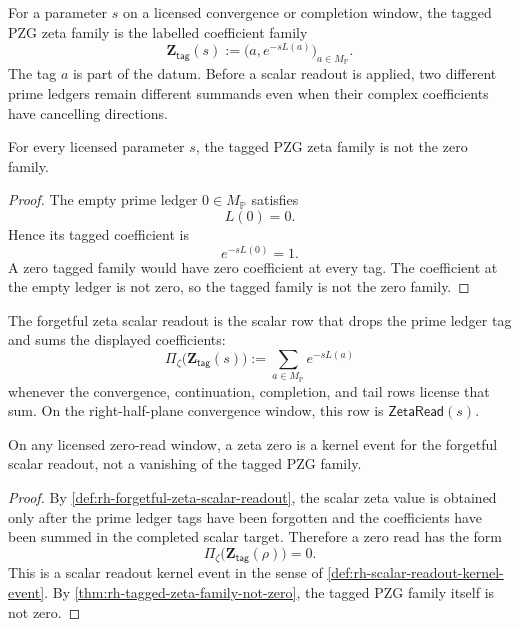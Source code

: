 \begin{definition}
\label{def:rh-tagged-pzg-zeta-family}
For a parameter $s$ on a licensed convergence or completion window, the
tagged PZG zeta family is the labelled coefficient family
$$
\mathbf Z_{\mathsf{tag}}(s)
:=
\bigl(a,e^{-sL(a)}\bigr)_{a\in M_{\mathbb P}}.
$$
The tag $a$ is part of the datum.  Before a scalar readout is applied,
two different prime ledgers remain different summands even when their
complex coefficients have cancelling directions.
\end{definition}

\begin{theorem}
\label{thm:rh-tagged-zeta-family-not-zero}
For every licensed parameter $s$, the tagged PZG zeta family is not the
zero family.
\end{theorem}

\begin{proof}
The empty prime ledger $0\in M_{\mathbb P}$ satisfies
$$
L(0)=0.
$$
Hence its tagged coefficient is
$$
e^{-sL(0)}=1.
$$
A zero tagged family would have zero coefficient at every tag.  The
coefficient at the empty ledger is not zero, so the tagged family is not
the zero family.
\end{proof}

\begin{definition}
\label{def:rh-forgetful-zeta-scalar-readout}
The forgetful zeta scalar readout is the scalar row that drops the prime
ledger tag and sums the displayed coefficients:
$$
\Pi_{\zeta}\bigl(\mathbf Z_{\mathsf{tag}}(s)\bigr)
:=
\sum_{a\in M_{\mathbb P}}e^{-sL(a)}
$$
whenever the convergence, continuation, completion, and tail rows license
that sum.  On the right-half-plane convergence window, this row is
$\mathsf{ZetaRead}(s)$.
\end{definition}

\begin{theorem}
\label{thm:rh-zeta-zeros-forgetful-kernel-events}
On any licensed zero-read window, a zeta zero is a kernel event for the
forgetful scalar readout, not a vanishing of the tagged PZG family.
\end{theorem}

\begin{proof}
By \autoref{def:rh-forgetful-zeta-scalar-readout}, the scalar zeta value
is obtained only after the prime ledger tags have been forgotten and the
coefficients have been summed in the completed scalar target.  Therefore
a zero read has the form
$$
\Pi_{\zeta}\bigl(\mathbf Z_{\mathsf{tag}}(\rho)\bigr)=0.
$$
This is a scalar readout kernel event in the sense of
\autoref{def:rh-scalar-readout-kernel-event}.  By
\autoref{thm:rh-tagged-zeta-family-not-zero}, the tagged PZG family
itself is not zero.
\end{proof}

